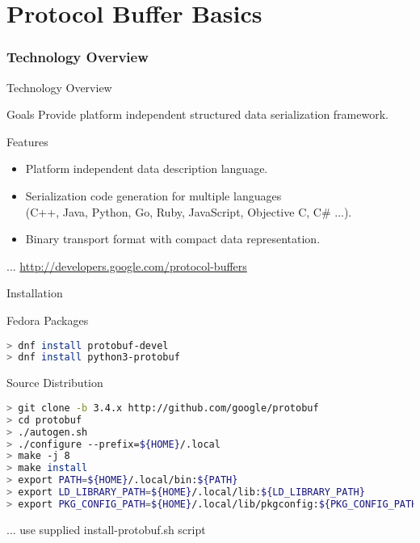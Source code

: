 \part{Protocol Buffer Basics}


\section{Technology Overview}


\begin{frame}{Technology Overview}
    \begin{block}{Goals}
        Provide platform independent structured data serialization framework.
    \end{block}

    \bigskip

    \begin{block}{Features}
        \begin{itemize}
            \item Platform independent data description language.
            \item Serialization code generation for multiple languages \\
                  (C++, Java, Python, Go, Ruby, JavaScript, Objective C, C\# ...).
            \item Binary transport format with compact data representation.
        \end{itemize}
    \end{block}

    \bigskip

    \hfill ... \url{http://developers.google.com/protocol-buffers}
\end{frame}


\begin{frame}[fragile]{Installation}
    \begin{block}{Fedora Packages}
\begin{lstlisting}[language=bash,style=mini]
> dnf install protobuf-devel
> dnf install python3-protobuf
\end{lstlisting}
    \end{block}

    \bigskip

    \begin{block}{Source Distribution}
\begin{lstlisting}[language=bash,style=mini]
> git clone -b 3.4.x http://github.com/google/protobuf
> cd protobuf
> ./autogen.sh
> ./configure --prefix=${HOME}/.local
> make -j 8
> make install
> export PATH=${HOME}/.local/bin:${PATH}
> export LD_LIBRARY_PATH=${HOME}/.local/lib:${LD_LIBRARY_PATH}
> export PKG_CONFIG_PATH=${HOME}/.local/lib/pkgconfig:${PKG_CONFIG_PATH}
\end{lstlisting}
    \end{block}

    \bigskip

    \hfill ... use supplied install-protobuf.sh script
\end{frame}


